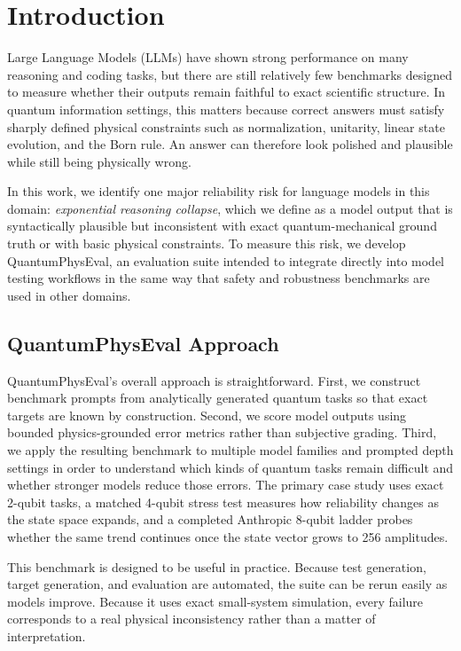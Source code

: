 \documentclass[11pt]{article}
\begin{document}
\section{Introduction}
Large Language Models (LLMs) have shown strong performance on many reasoning and coding tasks, but there are still relatively few benchmarks designed to measure whether their outputs remain faithful to exact scientific structure. In quantum information settings, this matters because correct answers must satisfy sharply defined physical constraints such as normalization, unitarity, linear state evolution, and the Born rule. An answer can therefore look polished and plausible while still being physically wrong.

In this work, we identify one major reliability risk for language models in this domain: \emph{exponential reasoning collapse}, which we define as a model output that is syntactically plausible but inconsistent with exact quantum-mechanical ground truth or with basic physical constraints. To measure this risk, we develop QuantumPhysEval, an evaluation suite intended to integrate directly into model testing workflows in the same way that safety and robustness benchmarks are used in other domains.

\subsection{QuantumPhysEval Approach}
QuantumPhysEval's overall approach is straightforward. First, we construct benchmark prompts from analytically generated quantum tasks so that exact targets are known by construction. Second, we score model outputs using bounded physics-grounded error metrics rather than subjective grading. Third, we apply the resulting benchmark to multiple model families and prompted depth settings in order to understand which kinds of quantum tasks remain difficult and whether stronger models reduce those errors. The primary case study uses exact 2-qubit tasks, a matched 4-qubit stress test measures how reliability changes as the state space expands, and a completed Anthropic 8-qubit ladder probes whether the same trend continues once the state vector grows to 256 amplitudes.

This benchmark is designed to be useful in practice. Because test generation, target generation, and evaluation are automated, the suite can be rerun easily as models improve. Because it uses exact small-system simulation, every failure corresponds to a real physical inconsistency rather than a matter of interpretation.
\end{document}
